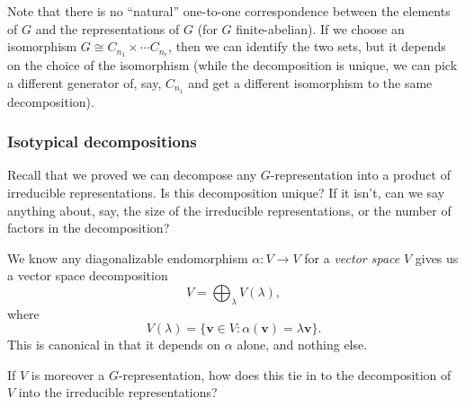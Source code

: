 \documentclass[a4paper]{article}
\begin{document}
Note that there is no ``natural'' one-to-one correspondence between the elements of $G$ and the representations of $G$ (for $G$ finite-abelian). If we choose an isomorphism $G \cong C_{n_1} \times \cdots C_{n_r}$, then we can identify the two sets, but it depends on the choice of the isomorphism (while the decomposition is unique, we can pick a different generator of, say, $C_{n_1}$ and get a different isomorphism to the same decomposition).

\subsubsection*{Isotypical decompositions}
Recall that we proved we can decompose any $G$-representation into a product of irreducible representations. Is this decomposition unique? If it isn't, can we say anything about, say, the size of the irreducible representations, or the number of factors in the decomposition?

We know any diagonalizable endomorphism $\alpha: V \to V$ for a \emph{vector space} $V$ gives us a vector space decomposition
\[
  V = \bigoplus_{\lambda} V(\lambda),
\]
where
\[
  V(\lambda) = \{\mathbf{v} \in V: \alpha(\mathbf{v}) = \lambda \mathbf{v}\}.
\]
This is canonical in that it depends on $\alpha$ alone, and nothing else.

If $V$ is moreover a $G$-representation, how does this tie in to the decomposition of $V$ into the irreducible representations?
\end{document}
